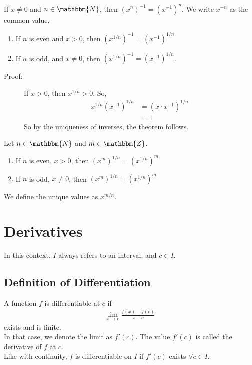 \documentclass[10pt]{extarticle}
\newcommand{\N}{\mathbbm{N}}
\newcommand{\Z}{\mathbbm{Z}}
\begin{document}
    If $x\neq 0$ and $n\in\N$, then $\left(x^n\right)^{-1} = (x^{-1})^n$. We write $x^{-n}$ as the common value.
    \begin{enumerate}[(1)]
      \item If $n$ is even and $x > 0$, then $\left(x^{1/n}\right)^{-1} = \left(x^{-1}\right)^{1/n}$ 
      \item If $n$ is odd, and $x\neq 0$, then $\left(x^{1/n}\right)^{-1} = \left(x^{-1}\right)^{1/n}$.
    \end{enumerate}
    \begin{description}
      \item[Proof:] If $x > 0$, then $x^{1/n} > 0$. So,
        \begin{align*}
          x^{1/n} \left(x^{-1}\right)^{1/n} &= (x\cdot x^{-1})^{1/n}\\
                                            &= 1
        \end{align*}
        So by the uniqueness of inverses, the theorem follows.
    \end{description}
    Let $n\in\N$ and $m\in\Z$.
    \begin{enumerate}[(1)]
      \item If $n$ is even, $x > 0$, then $\left(x^m\right)^{1/n}=\left(x^{1/n}\right)^m $
      \item If $n$ is odd, $x\neq 0$, then $\left(x^{m}\right)^{1/n} = \left(x^{1/n}\right)^m$
    \end{enumerate}
    We define the unique values as $x^{m/n}$.
  \section{Derivatives}%
    In this context, $I$ always refers to an interval, and $c\in I$.
  \subsection{Definition of Differentiation}%
    A function $f$ is differentiable at $c$ if
    \begin{align*}
      \lim_{x\rightarrow c}\frac{f(x) - f(c)}{x-c}
    \end{align*}
    exists and is finite.\\

    In that case, we denote the limit as $f'(c)$. The value $f'(c)$ is called the derivative of $f$ at $c$.\\

    Like with continuity, $f$ is differentiable on $I$ if $f'(c)$ exists $\forall c\in I$.
\end{document}
